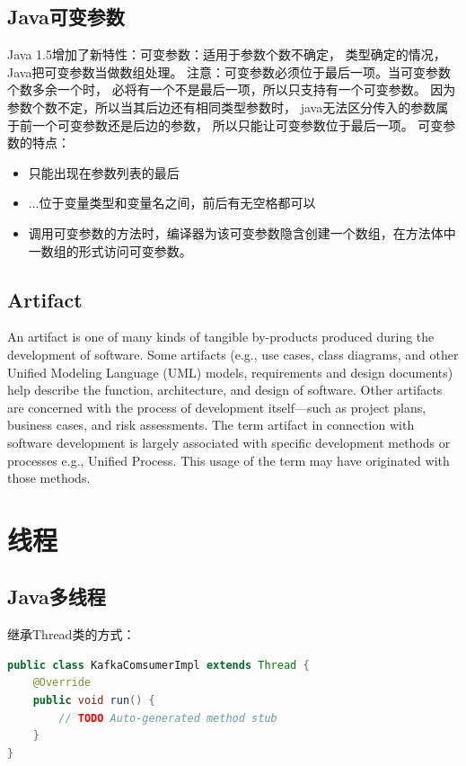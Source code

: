 \documentclass{book}
\begin{document}
\subsection{Java可变参数}

Java 1.5增加了新特性：可变参数：适用于参数个数不确定，
类型确定的情况，Java把可变参数当做数组处理。
注意：可变参数必须位于最后一项。当可变参数个数多余一个时，
必将有一个不是最后一项，所以只支持有一个可变参数。
因为参数个数不定，所以当其后边还有相同类型参数时，
java无法区分传入的参数属于前一个可变参数还是后边的参数，
所以只能让可变参数位于最后一项。
可变参数的特点：

\begin{itemize}
	\item{只能出现在参数列表的最后}
	\item{...位于变量类型和变量名之间，前后有无空格都可以}
	\item{调用可变参数的方法时，编译器为该可变参数隐含创建一个数组，在方法体中一数组的形式访问可变参数。}
\end{itemize}

\subsection{Artifact}

An artifact is one of many kinds of tangible by-products produced during the development of software. 
Some artifacts (e.g., use cases, class diagrams, and other Unified Modeling Language (UML) models, 
requirements and design documents) help describe the function, architecture, and design of software. 
Other artifacts are concerned with the process of development itself—such as project plans, 
business cases, and risk assessments.
The term artifact in connection with software development is largely associated 
with specific development methods or processes e.g., Unified Process. 
This usage of the term may have originated with those methods.

\section{线程}

\subsection{Java多线程}

继承Thread类的方式：

\begin{lstlisting}[language=Java]
public class KafkaComsumerImpl extends Thread {
	@Override
	public void run() {
		// TODO Auto-generated method stub		
	}
}
\end{lstlisting}
\end{document}
